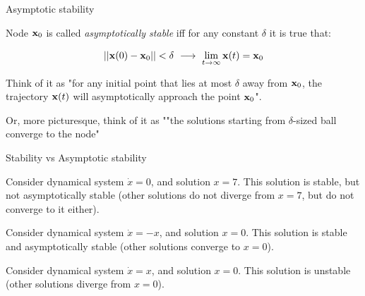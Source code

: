 \documentclass{beamer}
\begin{document}
\begin{frame}{Asymptotic stability}
\begin{flushleft}

Node $\mathbf{x}_0$ is called \emph{asymptotically stable} iff for any constant $\delta$ it is true that:

\begin{equation}
    ||\bo{x}(0) - \bo{x}_0|| < \delta \ \longrightarrow \ 
    \lim_{t\to\infty} \bo{x}(t) = \bo{x}_0
\end{equation}

\bigskip

Think of it as "for any initial point that lies at most $\delta$ away from $\mathbf{x}_0$, the trajectory $\mathbf{x}(t)$ will asymptotically approach the point $\mathbf{x}_0$".

\bigskip

Or, more picturesque, think of it as ""the solutions starting from $\delta$-sized ball converge to the node"

\end{flushleft}
\end{frame}




\begin{frame}{Stability vs Asymptotic stability}
\begin{flushleft}

\begin{example}
Consider dynamical system $\dot{x} = 0$, and solution $x = 7$. This solution is stable, but not asymptotically stable (other solutions do not diverge from $x = 7$, but do not converge to it either).
\end{example}

\begin{example}
Consider dynamical system $\dot{x} = -x$, and solution $x = 0$. This solution is stable and asymptotically stable (other solutions converge to $x = 0$).
\end{example}

\begin{example}
Consider dynamical system $\dot{x} = x$, and solution $x = 0$. This solution is unstable (other solutions diverge from $x = 0$).
\end{example}

\end{flushleft}
\end{frame}
\end{document}

